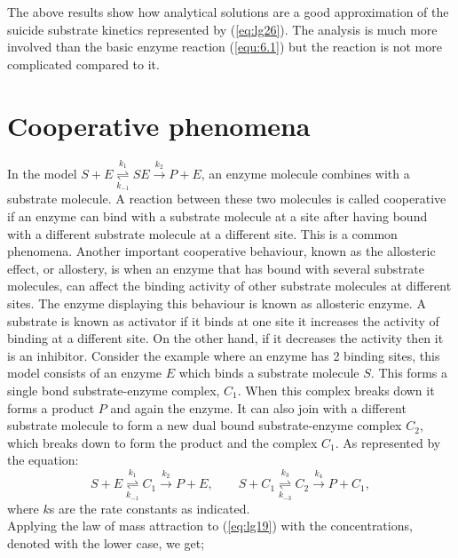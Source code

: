 \documentclass[a4paper]{report}
\theoremstyle{definition}
\begin{document}
The above results show how analytical solutions are a good approximation of the suicide substrate kinetics represented by (\ref{eq:lg26}). The analysis is much more involved than the basic enzyme reaction (\ref{equ:6.1}) but the reaction is not more complicated compared to it. 
\\
\section{Cooperative phenomena}
In the model $S+E \overset{k_1} {\underset{k_{-1}}{\rightleftharpoons}}SE \overset{k_2}{\rightarrow}P+E $,
an enzyme molecule combines with a substrate molecule. A reaction between these two molecules is called cooperative if an enzyme can bind with a substrate molecule at a site after having bound with a different substrate molecule at a different site. This is a common phenomena. Another important cooperative behaviour, known as the allosteric effect, or allostery, is when an enzyme that has bound with several substrate molecules, can affect the binding activity of other substrate molecules at different sites. The enzyme displaying this behaviour is known as allosteric enzyme. A substrate is known as activator if it binds at one site it increases the activity of binding at a different site. On the other hand, if it decreases the activity then it is an inhibitor.
Consider the example where an enzyme has 2 binding sites, this model consists of an enzyme $E$ which binds a substrate molecule $S$. This forms a single bond substrate-enzyme complex, $C_1$. When this complex breaks down it forms a product $P$ and again the enzyme. It can also join with a different substrate molecule to form a new dual bound substrate-enzyme complex $C_2$, which breaks down to form the product and the complex $C_1$. As represented by the equation:
\begin{equation}
\label{eq:lg19}
S+E \overset{k_1} {\underset{k_{-1}}{\rightleftharpoons}}C_1 \overset{k_2}{\rightarrow}P+E, \quad \quad
S+C_1 \overset{k_3} {\underset{k_{-3}}{\rightleftharpoons}}C_2 \overset{k_4}{\rightarrow}P+C_1,
\end{equation}
where $k$s are the rate constants as indicated.
\\
Applying the law of mass attraction to (\ref{eq:lg19}) with the concentrations, denoted with the lower case, we get;
\end{document}
